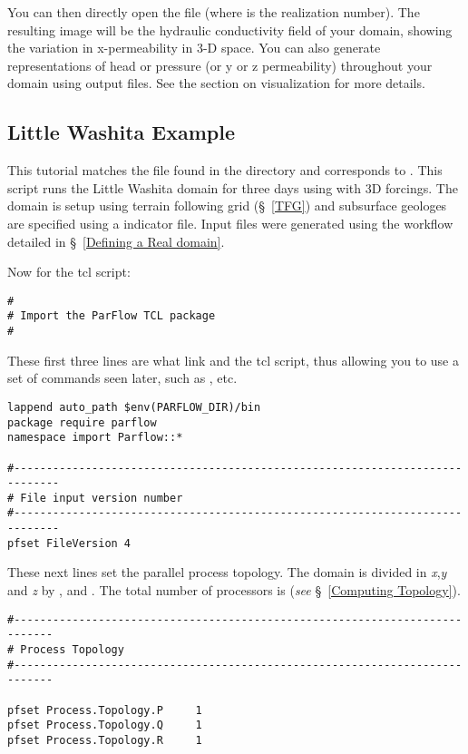 You can then directly open the file  (where \file{#} is the realization number).
The resulting image will be the hydraulic conductivity field of your domain, showing the variation in x-permeability in 3-D space.
You can also generate representations of head or pressure (or y or z permeability) throughout your domain using \parflow{} output files. 
See the section on visualization for more details.

\subsection{Little Washita Example}
\label{Little Washita Example}
This tutorial matches the  file found in the  
directory and corresponds to \cite{Condon14a, Condon14b}.  This script runs the Little Washita domain for three days using \parflow{}  with 3D forcings. 
The domain is setup using terrain following grid (\S~\ref{TFG}) and subsurface geologes are specified using a  indicator file. 
Input files were generated using the workflow detailed in \S~\ref{Defining a Real domain}. 

Now for the tcl script:

\begin{verbatim}
#
# Import the ParFlow TCL package
#
\end{verbatim}

These first three lines are what link \parflow{} and the tcl script, thus allowing you to use a set of commands seen later, such as , etc.

\begin{verbatim}
lappend auto_path $env(PARFLOW_DIR)/bin 
package require parflow
namespace import Parflow::*

#-----------------------------------------------------------------------------
# File input version number
#-----------------------------------------------------------------------------
pfset FileVersion 4
\end{verbatim}

These next lines set the parallel process topology.  The domain is divided in \emph{x},\emph{y} and \emph{z} by ,  and .
The total number of processors is   (\emph{see} \S~\ref{Computing Topology}).

\begin{verbatim}
#----------------------------------------------------------------------------
# Process Topology
#----------------------------------------------------------------------------

pfset Process.Topology.P     1
pfset Process.Topology.Q     1
pfset Process.Topology.R     1
\end{verbatim}

